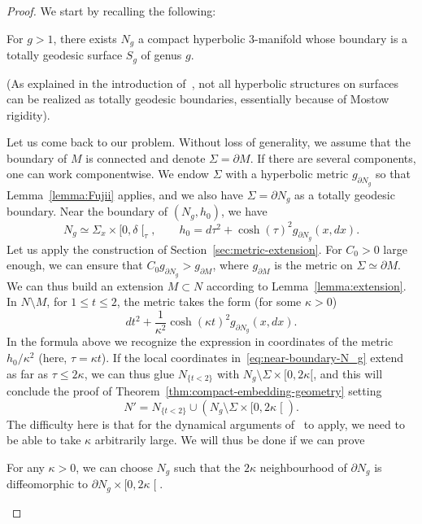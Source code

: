 \documentclass[AHL,Unicode,longabstracts,published]{cedram}
\theoremstyle{plain}
\begin{document}
\begin{proof}
We start by recalling the following:

\begin{lemm}
\label{lemma:Fujii}
For $g>1$, there exists $N_g$ a compact hyperbolic 3-manifold whose boundary is a totally geodesic surface $S_g$ of genus $g$.
\end{lemm}

(As explained in the introduction of~\cite{Fujii}, not all hyperbolic structures on surfaces can be realized as totally geodesic boundaries, essentially because of Mostow rigidity).

Let us come back to our problem. Without loss of generality, we assume that the boundary of $M$ is connected and denote $\Sigma=\partial M$. If there are several components, one can work componentwise. We endow $\Sigma$ with a hyperbolic metric $g_{\partial N_g}$ so that Lemma~\ref{lemma:Fujii} applies, and we also have $\Sigma = \partial N_g$ as a totally geodesic boundary. Near the boundary of $(N_g, h_0)$, we have
\begin{equation}\label{eq:near-boundary-N_g}
N_g \simeq \Sigma_x \times [0, \delta\mathclose{[}_\tau,\qquad h_0 = d\tau^2 + \cosh(\tau)^2 g_{\partial N_g}(x,dx).
\end{equation}
Let us apply the construction of Section~\ref{sec:metric-extension}. For $C_0>0$ large enough, we can ensure that $C_0 g_{\partial N_g}> g_{\partial M}$, where $g_{\partial M}$ is the metric on $\Sigma\simeq \partial M$. We can thus build an extension $M\subset N$ according to Lemma~\ref{lemma:extension}. In $N\setminus M$, for $1\leq t\leq 2$, the metric takes the form (for some $\kappa>0$)
\[
dt^2 + \frac{1}{\kappa^2}\cosh(\kappa t)^2 g_{\partial N_g}(x,dx).
\]
In the formula above we recognize the expression in coordinates of the metric $h_0/\kappa^2$ (here, $\tau = \kappa t$). If the local coordinates in~\eqref{eq:near-boundary-N_g} extend as far as $\tau \leq 2\kappa$, we can thus glue $N_{\{t< 2\}}$ with $N_g\setminus \Sigma\times[0,2\kappa[$, and this will conclude the proof of Theorem~\ref{thm:compact-embedding-geometry} setting
\[
N' = N_{\{t<2\}}\cup (N_g\setminus \Sigma\times [0,2\kappa\mathclose{[}).
\]
The difficulty here is that for the dynamical arguments of~\cite{Chen-Erchenko-Gogolev} to apply, we need to be able to take $\kappa$ arbitrarily large. We will thus be done if we can prove

\begin{lemm}\label{lemma:good-N_g}
For any $\kappa>0$, we can choose $N_g$ such that the $2\kappa$ neighbourhood of $\partial N_g$ is diffeomorphic to $\partial N_g \times [0,2\kappa\mathclose{[}$.
\end{lemm}


\end{proof}
\end{document}
